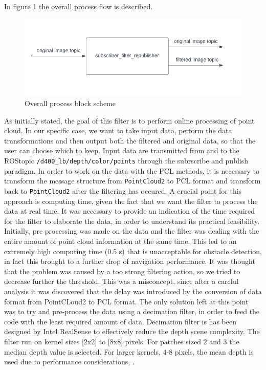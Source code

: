 In figure \ref{fig:filt_scheme} the overall process flow is described. 
\begin{figure}[H]

    \centering
    \includegraphics[scale=0.5]{Images/Chapter 6/filt_scheme.png}
    \caption{Overall process block scheme}
    \label{fig:filt_scheme}
\end{figure}
As initially stated, the goal of this filter is to perform online processing of point cloud. In our specific case, we want to take input data, perform the data transformations and then output both the filtered and original data, so that the user can choose which to keep.
Input data are transmitted from and to the ROStopic  \texttt{/d400\_lb/depth/color/points} through the subrscribe and publish paradigm. 
In order to work on the data with the PCL methods, it is necessary to transform the message structure from \texttt{PointCloud2} to PCL format and transform back to \texttt{PointCloud2} after the filtering has occured.
A crucial point for this approach is computing time, given the fact that we want the filter to process the data at real time.
It was necessary to provide an indication of the time required for the filter to elaborate the data, in order to understand its practical feasibility.
Initially, pre processing was made on the data and the filter was dealing with the entire amount of point cloud information at the same time. This led to an extremely high computing time (0.5 s) that is unacceptable for obstacle detection, in fact this brought to a further drop of navigation performance. 
It was thought that the problem was caused by a too strong filtering action, so we tried to decrease further the threshold.
This was a misconcept, since after a careful analysis it was discovered that the delay was introduced by the conversion of data format from PointCLoud2 to PCL format. 
The only solution left at this point was to try and pre-process the data using a decimation filter, in order to feed the code with the least required amount of data.
Decimation filter is has been designed by Intel RealSense to effectively reduce the depth scene complexity. The filter run on kernel sizes [2x2] to [8x8] pixels. For patches sized 2 and 3 the median depth value is selected. For larger kernels, 4-8 pixels, the mean depth is used due to performance considerations, \citet{intelrealsense}.

